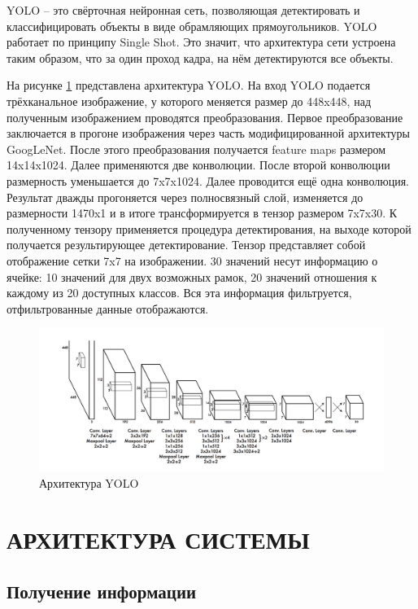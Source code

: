 YOLO  – это свёрточная нейронная сеть, позволяющая детектировать и классифицировать объекты в виде обрамляющих прямоугольников. YOLO работает по принципу Single Shot. Это значит, что архитектура сети устроена таким образом, что за один проход кадра, на нём детектируются все объекты.

На рисунке \ref{img:yolo} представлена архитектура YOLO. На вход YOLO подается трёхканальное изображение, у которого меняется размер до 448x448, над полученным изображением проводятся преобразования. Первое преобразование заключается в прогоне изображения через часть модифицированной архитектуры GoogLeNet. После этого преобразования получается feature maps размером 14x14x1024. Далее применяются две конволюции. После второй конволюции размерность уменьшается до 7x7x1024. Далее проводится ещё одна конволюция. Результат дважды прогоняется через полносвязный слой, изменяется до размерности 1470x1 и в итоге трансформируется в тензор размером 7x7x30. К полученному тензору применяется процедура детектирования, на выходе которой получается результирующее детектирование. Тензор представляет собой отображение сетки 7x7 на изображении. 30 значений несут информацию о ячейке: 10 значений для двух возможных рамок, 20 значений отношения к каждому из 20 доступных классов. Вся эта информация фильтруется, отфильтрованные данные отображаются.


\begin{figure}[H]
\centering
\includegraphics[width=15cm]{images/yolo.png}
\caption{Архитектура YOLO}
\label{img:yolo}
\end{figure}


\chapter{АРХИТЕКТУРА СИСТЕМЫ}


\section{Получение информации}


